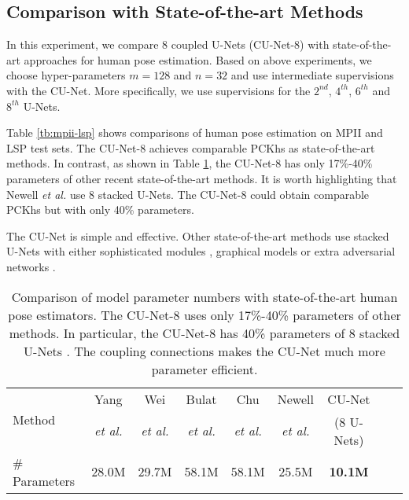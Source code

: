 \documentclass{bmvc2k}
\begin{document}
\subsection{Comparison with State-of-the-art Methods}

In this experiment, we compare 8 coupled U-Nets (CU-Net-8) with state-of-the-art approaches for human pose estimation. Based on above experiments, we choose hyper-parameters $m=128$ and $n=32$ and use intermediate supervisions with the CU-Net. More specifically, we use supervisions for the $2^{nd}$, $4^{th}$, $6^{th}$ and $8^{th}$ U-Nets.

Table \ref{tb:mpii-lsp} shows comparisons of human pose estimation on MPII and LSP test sets. The  CU-Net-8 achieves comparable PCKhs as state-of-the-art methods. In contrast, as shown in Table \ref{tb:para-num}, the CU-Net-8 has only 17\%-40\% parameters of other recent state-of-the-art methods. It is worth highlighting that Newell {\it et al.} \cite{newell2016stacked} use 8 stacked U-Nets. The CU-Net-8 could obtain comparable PCKhs but with only 40\% parameters.

The CU-Net is simple and effective. Other state-of-the-art methods use stacked U-Nets with either sophisticated modules \cite{yang2017learning}, graphical models \cite{chu2017multi} or extra adversarial networks \cite{yu2017adversarial}.






\begin{table}[t]
\begin{center}
\small
\caption{Comparison of model parameter numbers with state-of-the-art human pose estimators. The CU-Net-8 uses only 17\%-40\% parameters of other methods. In particular, the CU-Net-8 has 40\% parameters of 8 stacked U-Nets \cite{newell2016stacked}. The coupling connections makes the CU-Net much more parameter efficient.}\label{tb:para-num}
\setlength\tabcolsep{3pt}
\begin{tabular}{lcccccccc}
\toprule
\multirow{2}{*}{Method} & Yang  & Wei & Bulat  & Chu & Newell  & CU-Net\\
& {\it et al.}\cite{yang2017learning} & {\it et al.}\cite{wei2016convolutional}  
& {\it et al.}\cite{bulat2016human} & {\it et al.}\cite{chu2017multi} & {\it et al.}\cite{newell2016stacked} & (8 U-Nets)\\
\hline
\# Parameters & 28.0M & 29.7M & 58.1M & 58.1M & 25.5M & {\bf 10.1M}\\
\bottomrule
\end{tabular}
\end{center}
\vspace{-10pt}
\end{table}
\end{document}
